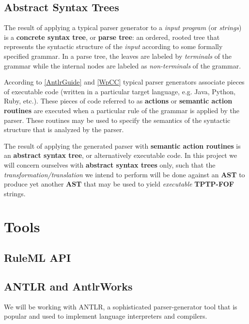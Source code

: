 \documentclass[letterpaper,10pt,english]{sphinxmanual}
\begin{document}
\subsection{Abstract Syntax Trees}
\label{project-proposal/index:abstract-syntax-trees}
The result of applying a typical parser generator to a \emph{input program} (or
\emph{strings}) is a
\textbf{concrete syntax tree}, or \textbf{parse tree}: an ordered, rooted tree that
represents the syntactic structure of the \emph{input} according to some formally
specified grammar.  In a parse tree, the leaves are labeled by \emph{terminals} of the
grammar while the internal nodes are labeled as \emph{non-terminals} of the grammar.

According to {\hyperref[project-proposal/index:antlrguide]{{[}AntlrGuide{]}}} and {\hyperref[project-proposal/index:wpcc]{{[}WpCC{]}}} typical parser generators associate
pieces of executable code (written in a particular target language, e.g. Java, Python,
Ruby, etc.).  These pieces of code referred to as \textbf{actions} or \textbf{semantic
action routines} are executed when a particular rule of the grammar is applied
by the parser.  These routines may be used to specify the semantics of the
syntactic structure that is analyzed by the parser.

The result of applying the generated parser with
\textbf{semantic action routines} is an \textbf{abstract syntax tree}, or alternatively
executable code.  In this project we will concern ourselves with \textbf{abstract
syntax trees} only, such that the \emph{transformation/translation} we intend to
perform will be done against an \textbf{AST} to produce yet another \textbf{AST} that may
be used to yield \emph{executable} \textbf{TPTP-FOF} strings.


\section{Tools}
\label{project-proposal/index:tools}

\subsection{RuleML API}
\label{project-proposal/index:ruleml-api}

\subsection{ANTLR and AntlrWorks}
\label{project-proposal/index:antlr-and-antlrworks}\label{project-proposal/index:index-1}
We will be working with ANTLR, a sophisticated parser-generator tool that is
popular and used to implement language interpreters and compilers.
\end{document}
